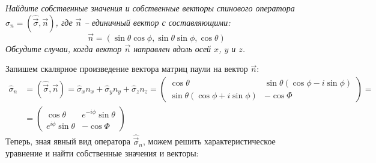 \begin{center}
    \textit{Найдите собственные значения и собственные векторы спинового оператора $\hat{\sigma}_n = (\hat{\Vec{\sigma}}, \Vec{n})$, где $\Vec{n}$ -- единичный вектор с составляющими:}
    \[
    \Vec{n} = (\sin\theta\cos\phi, \sin\theta\sin\phi, \cos\theta)
    \]
    \textit{Обсудите случаи, когда вектор $\Vec{n}$ направлен вдоль осей $x$, $y$ и $z$.}
\end{center}
Запишем скалярное произведение вектора матриц паули на вектор $\Vec{n}$:
\begin{align*}
    \hat{\sigma}_n & = (\hat{\Vec{\sigma}}, \Vec{n}) = \hat{\sigma}_x n_x + \hat{\sigma}_y n_y + \hat{\sigma}_z n_z = \left(\begin{array}{cc}
        \cos\theta & \sin\theta(\cos\phi - i\sin\phi) \\
        \sin\theta(\cos\phi + i\sin\phi)  & -\cos\Phi
    \end{array}
    \right) = \\ 
    & = 
    \left(\begin{array}{cc}
        \cos\theta & e^{-i\phi} \sin\theta\\
        e^{i\phi} \sin\theta & -\cos\Phi
    \end{array}
    \right)
\end{align*}
Теперь, зная явный вид оператора $\hat{\Vec{\sigma}}_n$, можем решить характеристическое уравнение и найти собственные значения и векторы:

